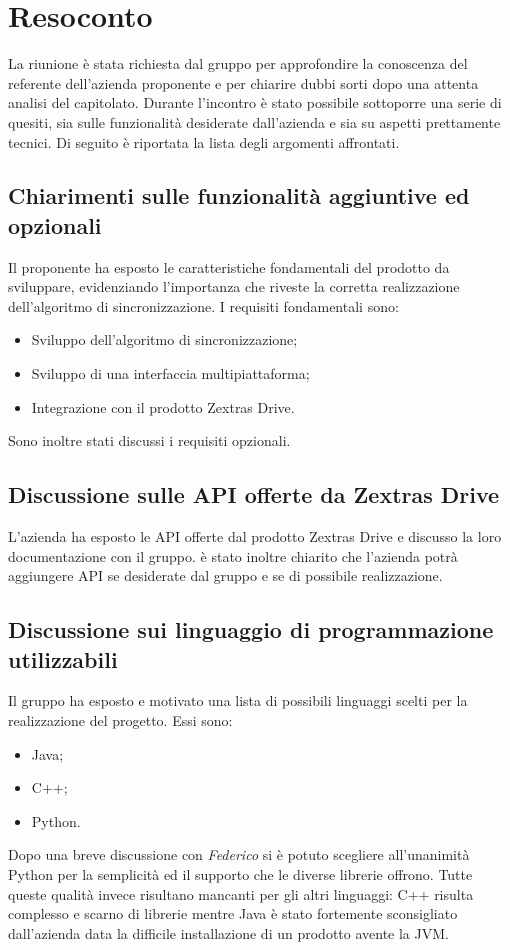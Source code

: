 \newpage


\section{Resoconto}
La riunione è stata richiesta dal gruppo \Gruppo{} per approfondire la conoscenza del referente dell'azienda proponente e per chiarire dubbi sorti dopo una attenta analisi del capitolato.
Durante l'incontro è stato possibile sottoporre una serie di quesiti, sia sulle funzionalità desiderate dall'azienda e sia su aspetti prettamente tecnici.
Di seguito è riportata la lista degli argomenti affrontati.
\subsection{Chiarimenti sulle funzionalità aggiuntive ed opzionali}
Il proponente ha esposto le caratteristiche fondamentali del prodotto da sviluppare, evidenziando l'importanza che riveste la corretta realizzazione dell'algoritmo di sincronizzazione.
I requisiti fondamentali sono:
\begin{itemize}
	\item Sviluppo dell'algoritmo di sincronizzazione;
	\item Sviluppo di una interfaccia multipiattaforma;
	\item Integrazione con il prodotto Zextras Drive.
\end{itemize}
Sono inoltre stati discussi i requisiti opzionali.
\subsection{Discussione sulle API offerte da Zextras Drive}
L'azienda ha esposto le API offerte dal prodotto Zextras Drive e discusso la loro documentazione con il gruppo. è stato inoltre chiarito che l'azienda potrà aggiungere API se  desiderate dal gruppo e se di possibile realizzazione.
\subsection{Discussione sui linguaggio di programmazione utilizzabili}
Il gruppo ha esposto e motivato una lista di possibili linguaggi scelti per la realizzazione del progetto. Essi sono:
\begin{itemize}
	\item Java;
	\item C++;
	\item Python.
\end{itemize}
Dopo una breve discussione con \textit{Federico} si è potuto scegliere all'unanimità Python per la semplicità ed il supporto che le diverse librerie offrono. Tutte queste qualità invece risultano mancanti per gli altri linguaggi: C++ risulta complesso e scarno di librerie mentre Java è stato fortemente sconsigliato dall'azienda data la difficile installazione di un prodotto avente la JVM.

